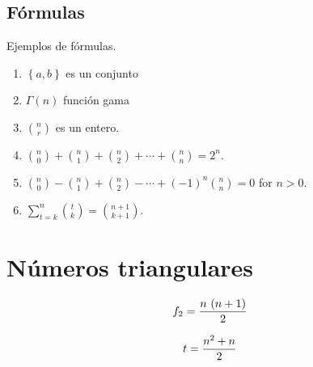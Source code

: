 \documentclass[12pt,letterpaper]{article}
\begin{document}

\subsection{F\'ormulas}
Ejemplos de f\'ormulas.

\begin{enumerate}
\item \label{set}
   $\left \{a , b \right \}$ es un conjunto
\item \label{gamma}
   $\Gamma\left(n\right)$ función gama
\item \label{isinteger}
   $n\choose r$ es un entero. 
\item \label{sum2n}
   ${n\choose 0}+{n\choose 1}+{n\choose 2}+\cdots+{n\choose n}=2^n$.
\item \label{sum0}
   ${n\choose 0}-{n\choose 1}+{n\choose 2}-\cdots+(-1)^n{n\choose n}=0$ for $n>0$.
\item \label{sump1}
   $\sum_{t=k}^n {t\choose k }={n+1\choose k+1}$.
\end{enumerate}

\section{Números triangulares}

$$f_{2}={{n\,\left(n+1\right)}\over{2}}$$

$$t={{n^2+n}\over{2}}$$

\citep{Edwards2002Pascals}

\citep{NIST:DLMF}


%

\end{document}
